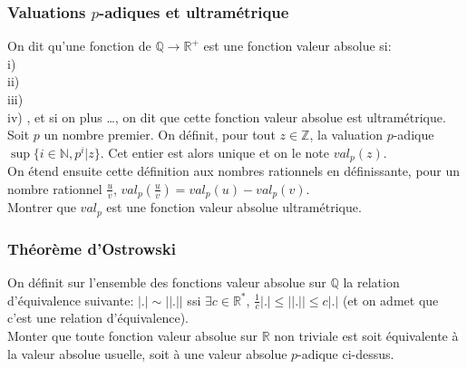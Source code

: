 \documentclass{article}
\begin{document}
\subsubsection{Valuations $p$-adiques et ultram\'etrique}
On dit qu'une fonction de $\mathbb{Q}\to\mathbb{R^+}$ est une fonction valeur absolue si:\\
i) \\
ii) \\
iii) \\
iv) , et si on plus \dots, on dit que cette fonction valeur absolue est ultram\'etrique.\\
Soit $p$ un nombre premier. On d\'efinit, pour tout $z\in\mathbb{Z}$, la valuation $p$-adique $\sup\{i\in\mathbb{N},p^i|z\}$. Cet entier est alors unique et on le note $val_p(z)$.\\
On \'etend ensuite cette d\'efinition aux nombres rationnels en d\'efinissante, pour un nombre rationnel $\frac{u}{v}$, $val_p(\frac{u}{v})=val_p(u)-val_p(v)$.\\
Montrer que $val_p$ est une fonction valeur absolue ultram\'etrique.

\subsubsection{Th\'eor\`eme d'Ostrowski}
On d\'efinit sur l'ensemble des fonctions valeur absolue sur $\mathbb{Q}$ la relation d'\'equivalence suivante: $|.|\sim||.||$ ssi $\exists c\in\mathbb{R^*}$, $\frac{1}{c}|.|\leq||.||\leq c|.|$ (et on admet que c'est une relation d'\'equivalence).\\
Monter que toute fonction valeur absolue sur $\mathbb{R}$ non triviale est soit \'equivalente \`a la valeur absolue usuelle, soit \`a une valeur absolue $p$-adique ci-dessus.
\end{document}
